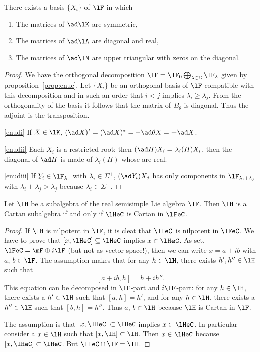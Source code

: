 \begin{lemma}
There exists a basis $\{X_i\}$ of $\lF$ in which

\begin{enumerate}
\item\label{enudi} The matrices of $\ad\lK$ are symmetric,
\item\label{enudii} The matrices of $\ad\lA$ are diagonal and real,
\item\label{enudiii} The matrices of $\ad\lN$ are upper triangular with zeros on the diagonal.
\end{enumerate}
\end{lemma}

\begin{proof}
We have the orthogonal decomposition $\lF=\lF_0\bigoplus_{\lambda\in\Sigma}\lF_{\lambda}$ given by proposition~\ref{prop:enuc}. Let $\{X_i\}$ be an orthogonal basis of $\lF$ compatible with this decomposition and in such an order that $i<j$ implies $\lambda_i\geq\lambda_j$. From the orthogonality of the basis it follows that the matrix of $B_{\theta}$ is diagonal. Thus the adjoint is the transposition.

\ref{enudi} If $X\in\lK$, $(\ad X)^t=(\ad X)^*=-\ad\theta X=-\ad X$.

\ref{enudii} Each $X_i$ is a restricted root; then $(\ad H)X_i=\lambda_i(H)X_i$, then the diagonal of $\ad H$ is made of $\lambda_i(H)$ whose are real.

\ref{enudiii} If $Y_i\in\lF_{\lambda_i}$ with $\lambda_i\in\Sigma^+$, $(\ad Y_i)X_j$ has only components in $\lF_{\lambda_i+\lambda_j}$ with $\lambda_i+\lambda_j>\lambda_j$ because $\lambda_i\in\Sigma^+$.
\end{proof}


\begin{lemma}
Let $\lH$ be a subalgebra of the real semisimple Lie algebra $\lF$. Then $\lH$ is a Cartan subalgebra if and only if $\lHeC$ is Cartan in $\lFeC$.
\end{lemma}

\begin{proof}
 If $\lH$ is nilpotent in $\lF$, it is cleat that $\lHeC$ is nilpotent in $\lFeC$. We have to prove that $[x,\lHeC]\subseteq\lHeC$ implies $x\in\lHeC$. As set, $\lFeC=\mF\oplus i\lF$  (but not as vector space!), then we can write $x=a+ib$ with $a$, $b\in\lF$. The assumption makes that for any $h\in\lH$, there exists $h',h''\in\lH$ such that
\[
   [a+ib,h]=h+ih''.
\]
This equation can be decomposed in $\lF$-part and $i\lF$-part: for any $h\in\lH$, there exists a $h'\in\lH$ such that $[a,h]=h'$,  and for any $h\in\lH$, there exists a $h''\in\lH$ such that $[b,h]=h''$. Thus $a$, $b\in\lH$ because $\lH$ is Cartan in $\lF$.

 The assumption is that $[x,\lHeC]\subset\lHeC$ implies $x\in\lHeC$. In particular consider a $x\in\lH$ such that $[x,\lH]\subset\lH$. Then $x\in\lHeC$ because $[x,\lHeC]\subset\lHeC$. But $\lHeC\cap\lF=\lH$.
\end{proof}

